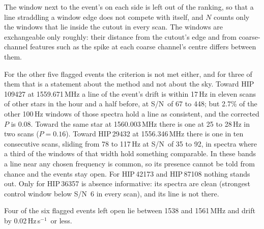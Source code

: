 \documentclass[twocolumn]{aastex631}
\newcommand{\hzs}{Hz\,s$^{-1}$}
\newcommand{\sn}{S/N}
\begin{document}
The window next to the event's on each side is left out of the ranking, so
that a line straddling a window edge does not compete with itself, and $N$
counts only the windows that lie inside the cutout in every scan. The
windows are exchangeable only roughly: their distance from the cutout's
edge and from coarse-channel features such as the spike at each
coarse channel's centre differs between them.

For the other five flagged events the criterion is not met either, and for three
of them that is a statement about the method and not about the sky. Toward
HIP\,109427 at 1559.671\,MHz a line of the event's drift is within 17\,Hz
in eleven scans of other stars in the hour and a half before, at \sn\ of 67
to 448; but 2.7\% of the other 100\,Hz windows of those spectra hold a line
as consistent, and the corrected $P$ is 0.08. Toward the same star at
1560.003\,MHz there is one at 25 to 28\,Hz in two scans ($P=0.16$). Toward
HIP\,29432 at 1556.346\,MHz there is one in ten consecutive scans, sliding
from 78 to 117\,Hz at \sn\ of 35 to 92, in spectra where a third of the
windows of that width hold something comparable. In these bands a line near
any chosen frequency is common, so its presence cannot be told from chance
and the events stay open. For HIP\,42173 and HIP\,87108 nothing stands
out. Only for HIP\,36357 is absence informative: its spectra are clean
(strongest control window below \sn\ 6 in every scan), and its line is
not there.

Four of the six flagged events left open lie between 1538 and 1561\,MHz and
drift by 0.02\,\hzs\ or less.
\end{document}
